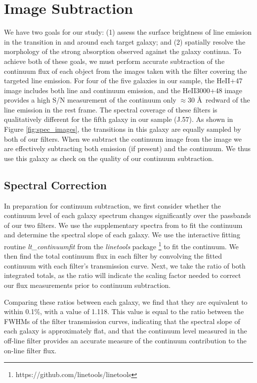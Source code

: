 \documentclass[twocolumn]{aastex62}
\begin{document}
\section{Image Subtraction}\label{sec.cont_sub}
We have two goals for our study: (1) assess the surface brightness of line emission in the  transition in and around each target galaxy; and (2) spatially resolve the morphology of the strong  absorption observed against the galaxy continua.
To achieve both of these goals, we must perform accurate subtraction of the continuum flux of each object from the images taken with the filter covering the targeted line emission. For four of the five galaxies in our sample, the HeII+47 image includes both line and continuum emission, and the HeII3000+48 image provides a high S/N measurement of the continuum only $\approx30$ \AA\ redward of the line emission in the rest frame. %
The spectral coverage of these filters is qualitatively different for the fifth galaxy in our sample (J.57).
As shown in Figure \ref{fig:spec_images}, the  transitions in this galaxy are equally sampled by both of our filters. When we subtract the continuum image from the  image we are effectively subtracting both  emission (if present) and the continuum. We thus use this galaxy as check on the quality of our continuum subtraction.

\subsection{Spectral Correction}
In preparation for continuum subtraction, we first consider whether the continuum level of each galaxy spectrum changes significantly over the passbands of our two filters.
We use the supplementary spectra from \citet{Rubin_2014} to fit the continuum and determine the spectral slope of each galaxy. We use the interactive fitting routine \emph{lt\_continuumfit} from the \emph{linetools} package \citep{Prochaska2016}\footnote{https://github.com/linetools/linetools} to fit the continuum. We then find the total continuum flux in each filter by convolving the fitted continuum with each filter's transmission curve. Next, we take the ratio of both integrated totals, as the ratio will indicate the scaling factor needed to correct our flux measurements prior to continuum subtraction. 

Comparing these ratios between each galaxy, we find that they are equivalent to within 0.1\%, with a value of 1.118. This value is equal to the ratio between the FWHMs of the filter transmission curves, indicating that the spectral slope of each galaxy is approximately flat, and that the continuum level measured in the off-line filter provides an accurate measure of the continuum contribution to the on-line filter flux.
\end{document}
